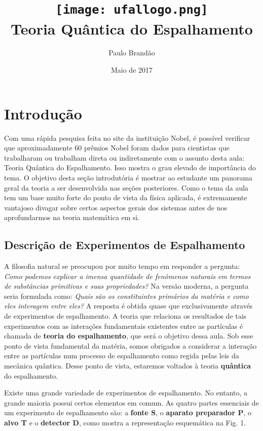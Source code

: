 \documentclass{article}
\title{\texttt{[image: ufallogo.png]} \\
\Huge{\color{astral}\textbf{Teoria Quântica do Espalhamento}}}
\author{Paulo Brandão}
\date{Maio de 2017}
\begin{document}
\maketitle

\section{Introdução}

Com uma rápida pesquisa feita no site da instituição Nobel, é possível verificar que aproximadamente 60 prêmios Nobel foram dados para cientistas que trabalharam ou trabalham direta ou indiretamente com o assunto desta aula: Teoria Quântica do Espalhamento. Isso mostra o grau elevado de importância do tema. O objetivo desta seção introdutória é mostrar ao estudante um panorama geral da teoria a ser desenvolvida nas seções posteriores. Como o tema da aula tem um base muito forte do ponto de vista da física aplicada, é extremamente vantajoso divagar sobre certos aspectos gerais dos sistemas antes de nos aprofundarmos na teoria matemática em si.

\subsection{Descrição de Experimentos de Espalhamento}

A filosofia natural se preocupou por muito tempo em responder a pergunta: \textit{Como podemos explicar a imensa quantidade de fenômenos naturais em termos de substâncias primitivas e suas propriedades?} Na versão moderna, a pergunta seria formulada como: \textit{Quais são os constituintes primários da matéria e como eles interagem entre eles?} A resposta é obtida quase que exclusivamente através de experimentos de espalhamento. A teoria que relaciona os resultados de tais experimentos com as interações fundamentais existentes entre as partículas é chamada de \textbf{teoria do espalhamento}, que será o objetivo dessa aula. Sob esse ponto de vista fundamental da matéria, somos obrigados a considerar a interação entre as partículas num processo de espalhamento como regida pelas leis da mecânica quântica. Desse ponto de vista, estaremos voltados à teoria \textbf{quântica} do espalhamento.

Existe uma grande variedade de experimentos de espalhamento. No entanto, a grande maioria possui certos elementos em comum. As quatro partes essenciais de um experimento de espalhamento são: a \textbf{fonte S}, o \textbf{aparato preparador P}, o \textbf{alvo T} e o \textbf{detector D}, como mostra a representação esquemática na Fig. 1.
\end{document}
